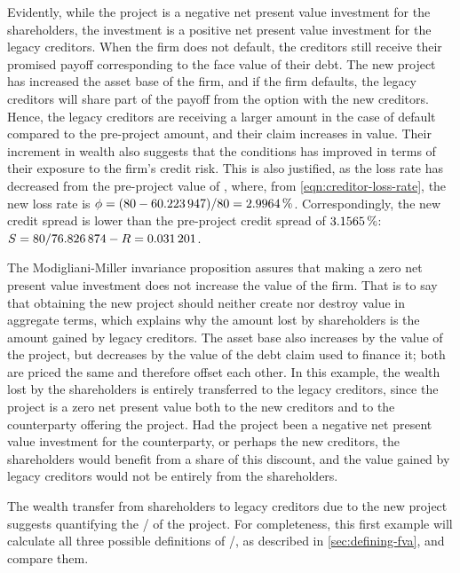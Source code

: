 \documentclass[main.tex]{subfiles}
\begin{document}
        Evidently, while the project is a negative net present value investment for the shareholders,
        the investment is a positive net present value investment for the legacy creditors.
        When the firm does not default, the creditors still receive their promised payoff 
        corresponding to the face value of their debt.
        The new project has increased the asset base of the firm, and if the firm defaults, 
        the legacy creditors will share part of the payoff from the option with the new creditors.
        Hence, the legacy creditors are receiving a larger amount in the case of default compared to the pre-project amount, and their claim increases in value.
        Their increment in wealth also suggests that the conditions has improved in terms of their exposure to the firm's credit risk.
        This is also justified, as the loss rate has decreased from the pre-project value of ,
        where, from \cref{eqn:creditor-loss-rate}, the new loss rate is $\phi = (\num{80}-\num{60.223947})/\num{80} = \pct{0.029964}$.
        Correspondingly, the new credit spread is lower than the pre-project credit spread of $\pct{0.031565}$:
        $S = \num{80}/\num{76.826874} - R = \num{0.031201}$.

        The Modigliani-Miller invariance proposition assures that making a zero net present value investment 
        does not increase the value of the firm.
        That is to say that obtaining the new project should neither create nor destroy value in aggregate terms,
        which explains why the amount lost by shareholders is the amount gained by legacy creditors.
        The asset base also increases by the value of the project, 
        but decreases by the value of the debt claim used to finance it; 
        both are priced the same and therefore offset each other.
        In this example, the wealth lost by the shareholders is entirely transferred to the legacy creditors,
        since the project is a zero net present value both to the new creditors 
        and to the counterparty offering the project.
        Had the project been a negative net present value investment for the counterparty, 
        or perhaps the new creditors, the shareholders would benefit from a share of this discount,
        and the value gained by legacy creditors would not be entirely from the shareholders.

        The wealth transfer from shareholders to legacy creditors due to the new project 
        suggests quantifying the \FVA/ of the project.
        For completeness, this first example will calculate all three possible definitions of \FVA/,
        as described in \cref{sec:defining-fva}, and compare them.
\end{document}
